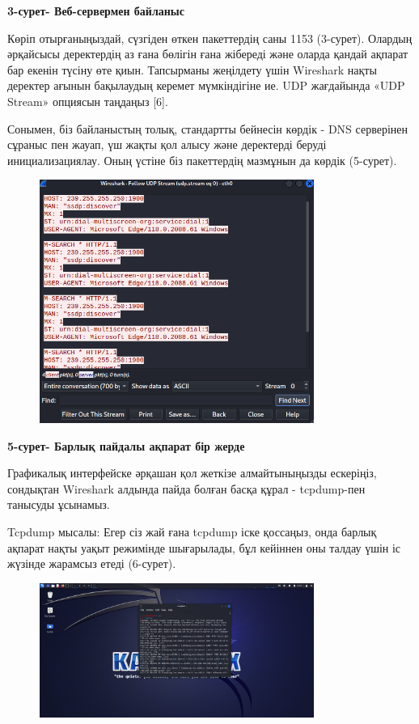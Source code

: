 \textbf{3-сурет- Веб-сервермен байланыс}

Көріп отырғаныңыздай, сүзгіден өткен пакеттердің саны 1153 (3-сурет).
Олардың әрқайсысы деректердің аз ғана бөлігін ғана жібереді және оларда
қандай ақпарат бар екенін түсіну өте қиын. Тапсырманы жеңілдету үшін
Wireshark нақты деректер ағынын бақылаудың керемет мүмкіндігіне ие. UDP
жағдайында «UDP Stream» опциясын таңдаңыз {[}6{]}.

Сонымен, біз байланыстың толық, стандартты бейнесін көрдік - DNS
серверінен сұраныс пен жауап, үш жақты қол алысу және деректерді беруді
инициализациялау. Оның үстіне біз пакеттердің мазмұнын да көрдік
(5-сурет).

\begin{figure}[H]
	\centering
	\includegraphics[width=0.8\textwidth]{assets/29}
	\caption*{}
\end{figure}

\textbf{5-сурет- Барлық пайдалы ақпарат бір жерде}

Графикалық интерфейске әрқашан қол жеткізе алмайтыныңызды ескеріңіз,
сондықтан Wireshark алдында пайда болған басқа құрал - tcpdump-пен
танысуды ұсынамыз.

Tcpdump мысалы: Егер сіз жай ғана tcpdump іске қоссаңыз, онда барлық
ақпарат нақты уақыт режимінде шығарылады, бұл кейіннен оны талдау үшін
іс жүзінде жарамсыз етеді (6-сурет).

\begin{figure}[H]
	\centering
	\includegraphics[width=0.8\textwidth]{assets/30}
	\caption*{}
\end{figure}

